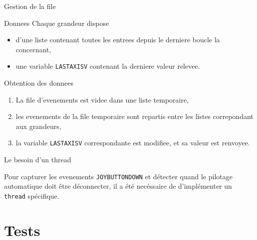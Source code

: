 \documentclass[footheight=2em]{beamer}
\begin{document}
\begin{frame}[t]{Gestion de la file}
  \begin{block}{Donnees}
    Chaque grandeur dispose
    \begin{itemize}
      \item d'une liste contenant toutes les entrees depuis le derniere boucle
        la concernant,
      \item une variable \texttt{LASTAXISV} contenant la derniere
        valeur relevee.
    \end{itemize}
  \end{block}
  \begin{block}{Obtention des donnees}
    \begin{enumerate}
      \item La file d'evenements est videe dans une liste temporaire,
      \item les evenements de la file temporaire sont repartis entre les listes
        correpondant aux grandeurs,
      \item la variable \texttt{LASTAXISV} correspondante est modifiee, et sa
        valeur est renvoyee.
    \end{enumerate}
  \end{block}
\end{frame}

\begin{frame}[t]{Le besoin d'un thread}
  \begin{block}{\texttt{}}
    Pour capturer les evenements \texttt{JOYBUTTONDOWN} et détecter quand le
    pilotage automatique doit être déconnecter, il a été necéssaire de d'implémenter
    un \texttt{thread} spécifique.
  \end{block}
\end{frame}


\section{Tests}
\end{document}

